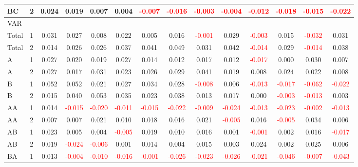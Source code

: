 \begin{table}[H]
{\begin{tabular}{llcccccccccccc}
BC & 2 & 0.024 & 0.019 & 0.007 & 0.004 & \textcolor{red}{-0.007} & \textcolor{red}{-0.016} & \textcolor{red}{-0.003} & \textcolor{red}{-0.004} & \textcolor{red}{-0.012} & \textcolor{red}{-0.018} & \textcolor{red}{-0.015} & \textcolor{red}{-0.022}\\
\hline
VAR &  &  &  &  &  &  &  &  &  &  &  &  & \\
\hline
Total & 1 & 0.031 & 0.027 & 0.008 & 0.022 & 0.005 & 0.016 & \textcolor{red}{-0.001} & 0.029 & \textcolor{red}{-0.003} & 0.015 & \textcolor{red}{-0.032} & 0.031\\
Total & 2 & 0.014 & 0.026 & 0.026 & 0.037 & 0.041 & 0.049 & 0.031 & 0.042 & \textcolor{red}{-0.014} & 0.029 & \textcolor{red}{-0.014} & 0.038\\
A & 1 & 0.027 & 0.020 & 0.019 & 0.027 & 0.014 & 0.012 & 0.017 & 0.012 & \textcolor{red}{-0.017} & 0.000 & 0.030 & 0.007\\
A & 2 & 0.027 & 0.017 & 0.031 & 0.023 & 0.026 & 0.029 & 0.041 & 0.019 & 0.008 & 0.024 & 0.022 & 0.008\\
B & 1 & 0.052 & 0.052 & 0.021 & 0.027 & 0.034 & 0.028 & \textcolor{red}{-0.008} & 0.006 & \textcolor{red}{-0.013} & \textcolor{red}{-0.017} & \textcolor{red}{-0.062} & \textcolor{red}{-0.022}\\
B & 2 & 0.015 & 0.040 & 0.053 & 0.035 & 0.023 & 0.038 & 0.013 & 0.017 & 0.000 & \textcolor{red}{-0.003} & \textcolor{red}{-0.013} & 0.003\\
AA & 1 & 0.014 & \textcolor{red}{-0.015} & \textcolor{red}{-0.020} & \textcolor{red}{-0.011} & \textcolor{red}{-0.015} & \textcolor{red}{-0.022} & \textcolor{red}{-0.009} & \textcolor{red}{-0.024} & \textcolor{red}{-0.013} & \textcolor{red}{-0.023} & \textcolor{red}{-0.002} & \textcolor{red}{-0.013}\\
AA & 2 & 0.007 & 0.007 & 0.021 & 0.010 & 0.018 & 0.016 & 0.021 & \textcolor{red}{-0.005} & 0.016 & \textcolor{red}{-0.005} & 0.034 & 0.006\\
AB & 1 & 0.023 & 0.005 & 0.004 & \textcolor{red}{-0.005} & 0.019 & 0.010 & 0.016 & 0.001 & \textcolor{red}{-0.001} & 0.002 & 0.016 & \textcolor{red}{-0.017}\\
AB & 2 & 0.019 & \textcolor{red}{-0.024} & \textcolor{red}{-0.006} & 0.001 & 0.014 & 0.004 & 0.015 & 0.003 & 0.024 & 0.002 & 0.025 & 0.006\\
BA & 1 & 0.013 & \textcolor{red}{-0.004} & \textcolor{red}{-0.010} & \textcolor{red}{-0.016} & \textcolor{red}{-0.001} & \textcolor{red}{-0.026} & \textcolor{red}{-0.023} & \textcolor{red}{-0.026} & \textcolor{red}{-0.021} & \textcolor{red}{-0.046} & \textcolor{red}{-0.007} & \textcolor{red}{-0.043}\\

\end{tabular}}
\end{table}
